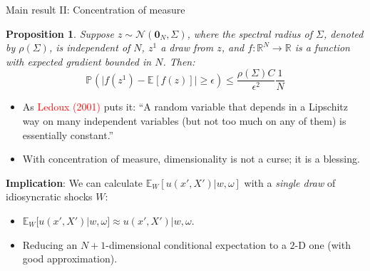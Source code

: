 \documentclass[aspectratio=169,10pt]{beamer}
\newcommand{\emphcolor}[1]{\textbf{\textcolor{emphcolorval}{#1}}}
\newtheorem{proposition}{Proposition}
\newcommand{\prob}[2][]{\ensuremath{\mathbb{P}_{#1}\left( {#2} \right)}}
\newcommand{\expec}[2][]{\ensuremath{\mathbb{E}_{{#1}}\left[ {#2} \right]}}
\begin{document}
		
\begin{frame}[label=concentration]{Main result II: Concentration of measure}\label{Concentration}
			\begin{proposition}
				Suppose $z \sim \mathcal{N}(\mathbf{0}_N,\Sigma)$, where the spectral radius of $\Sigma$, denoted by $\rho(\Sigma)$, is independent of $N$, $z^1$ a draw from $z$, and $f:\mathbb{R}^N \rightarrow \mathbb{R}$ is a function with expected gradient bounded in $N$. Then:
				\begin{equation*}
					\prob{\big|f(z^1)-\expec{f(z)}\big|\geq \epsilon} \leq \frac{\rho(\Sigma) C}{\epsilon^2} \frac{1}{N}
				\end{equation*}
				\vspace{-0.2in}
			\end{proposition}
			\begin{itemize}
				\item As \textcolor{red}{Ledoux (2001)} puts it: ``A random variable that depends in a Lipschitz way on many independent variables (but not too much on any of them) is essentially constant.''\vspace{0.1in}
				\item With concentration of measure, dimensionality is not a curse; it is a blessing.\vspace{0.1in}
			\end{itemize}
			\emphcolor{Implication}: We can calculate $\mathbb{E}_{W}[u(x', X')|w, \omega]$ with a \textit{single draw} of idiosyncratic shocks $W$:
			\begin{itemize}
				\item $\mathbb{E}_W[u(x', X')|w, \omega]\approx u(x',X')|w,\omega$.\vspace{0.1in} 
				\item Reducing an $N+1$-dimensional conditional expectation to a $2$-D one (with good approximation). 
\end{itemize}
\end{frame}
\end{document}
